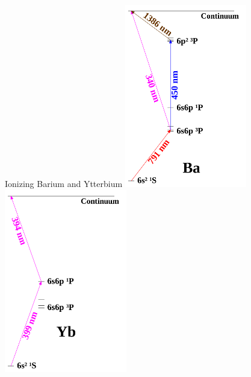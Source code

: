 \documentclass{beamer}
\begin{document}
\begin{frame}{Ionizing Barium and Ytterbium}
	\centering
	\includegraphics[width=0.4\textwidth]{neutral-Ba}
	\hfill
	\includegraphics[width=0.4\textwidth]{neutral-Yb}
\end{frame}
\end{document}
